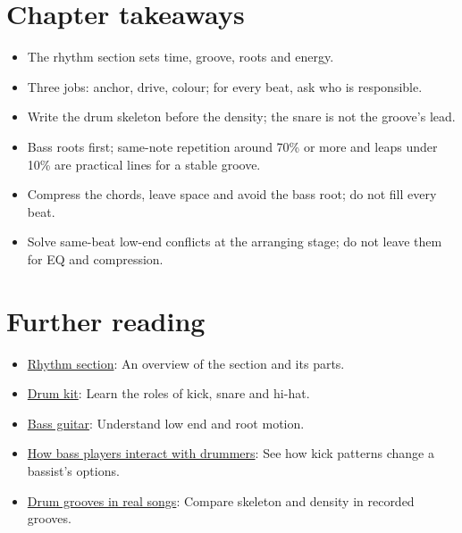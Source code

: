 \section{Chapter takeaways}
\label{sec:rhythm-takeaways}

\begin{itemize}
\item The rhythm section sets time, groove, roots and energy.
\item Three jobs: anchor, drive, colour; for every beat, ask who is responsible.
\item Write the drum skeleton before the density; the snare is not the groove's lead.
\item Bass roots first; same-note repetition around 70\% or more and leaps under 10\% are practical lines for a stable groove.
\item Compress the chords, leave space and avoid the bass root; do not fill every beat.
\item Solve same-beat low-end conflicts at the arranging stage; do not leave them for EQ and compression.
\end{itemize}

\section{Further reading}
\label{sec:03-rhythm-further-reading}
\begin{itemize}
  \item \href{https://en.wikipedia.org/wiki/Rhythm_section}{Rhythm section}: An overview of the section and its parts.
  \item \href{https://en.wikipedia.org/wiki/Drum_kit}{Drum kit}: Learn the roles of kick, snare and hi-hat.
  \item \href{https://en.wikipedia.org/wiki/Bass_guitar}{Bass guitar}: Understand low end and root motion.
  \item \href{https://www.youtube.com/watch?v=ewMBhY_6qls}{How bass players interact with drummers}: See how kick patterns change a bassist's options.
  \item \href{https://www.youtube.com/watch?v=uO4_OuZHh1Q}{Drum grooves in real songs}: Compare skeleton and density in recorded grooves.
\end{itemize}

